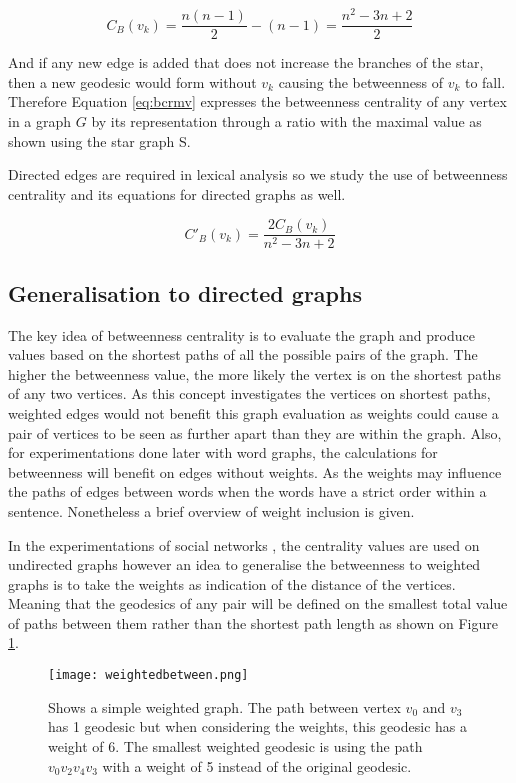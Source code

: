 \begin{equation}
C_B(v_k)= \frac{n(n-1)}{2} - (n-1) = \frac{n^2-3n+2}{2}
\end{equation}

And if any new edge is added that does not increase the branches of the star, then a new geodesic would form without $v_k$ causing the betweenness of $v_k$ to fall. Therefore Equation \ref{eq:bcrmv} expresses the betweenness centrality of any vertex in a graph $G$ by its representation through a ratio with the maximal value as shown using the star graph S.

Directed edges are required in lexical analysis so we study the use of betweenness centrality and its equations for directed graphs as well.

\begin{equation}\label{eq:bcrmv}
C'_B(v_k)= \frac{2C_B(v_k)}{n^2-3n+2}
\end{equation}

\subsection{Generalisation to directed graphs}
The key idea of betweenness centrality is to evaluate the graph and produce values based on the shortest paths of all the possible pairs of the graph. The higher the betweenness value, the more likely the vertex is on the shortest paths of any two vertices. As this concept investigates the vertices on shortest paths, weighted edges would not benefit this graph evaluation as weights could cause a pair of vertices to be seen as further apart than they are within the graph. Also, for experimentations done later with word graphs, the calculations for betweenness will benefit on edges without weights. As the weights may influence the paths of edges between words when the words have a strict order within a sentence. Nonetheless a brief overview of weight inclusion is given.

In the experimentations of social networks \cite{freeman1979centrality}, the centrality values are used on undirected graphs however an idea to generalise the betweenness to weighted graphs is to take the weights as indication of the distance of the vertices. Meaning that the geodesics of any pair will be defined on the smallest total value of paths between them rather than the shortest path length as shown on Figure \ref{fig:dbc}.

\begin{figure}[!htb]
	\centering
	\texttt{[image: weightedbetween.png]}
	\caption{Shows a simple weighted graph. The path between vertex $v_0$ and $v_3$ has 1 geodesic but when considering the weights, this geodesic has a weight of 6. The smallest weighted geodesic is using the path $v_0v_2v_4v_3$ with a weight of 5 instead of the original geodesic. }
	\label{fig:dbc}
\end{figure}

